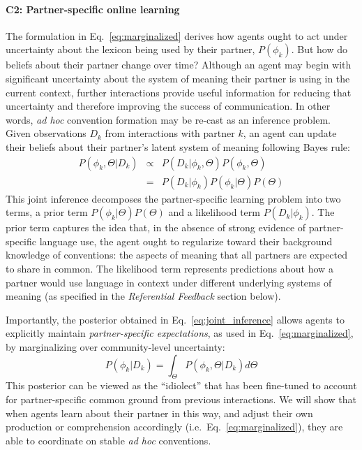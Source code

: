 \paragraph{C2: Partner-specific online learning}

The formulation in Eq.~\ref{eq:marginalized} derives how agents ought to act under uncertainty about the lexicon being used by their partner, $P(\phi_k)$.
But how do beliefs about their partner change over time?
Although an agent may begin with significant uncertainty about the system of meaning their partner is using in the current context, further interactions provide useful information for reducing that uncertainty and therefore improving the success of communication.
In other words, \emph{ad hoc} convention formation may be re-cast as an inference problem.
Given observations $D_k$ from interactions with partner $k$, an agent can update their beliefs about their partner's latent system of meaning following Bayes rule:
\begin{equation}
\begin{array}{rcl}
\label{eq:joint_inference}
P(\phi_k, \Theta | D_k)  & \propto &  P(D_k | \phi_k, \Theta) P(\phi_k, \Theta) \\
                           & =   & P(D_k | \phi_k) P(\phi_k | \Theta) P(\Theta)
\end{array}
\end{equation}
This joint inference decomposes the partner-specific learning problem into two terms, a prior term $P(\phi_k | \Theta)P(\Theta)$ and a likelihood term $P(D_k | \phi_k)$.
The prior term captures the idea that, in the absence of strong evidence of partner-specific language use, the agent ought to regularize toward their background knowledge of conventions: the aspects of meaning that all partners are expected to share in common.
The likelihood term represents predictions about how a partner would use language in context under different underlying systems of meaning (as specified in the \emph{Referential Feedback} section below).

Importantly, the posterior obtained in Eq.~\ref{eq:joint_inference} allows agents to explicitly maintain \emph{partner-specific expectations}, as used in Eq.~\ref{eq:marginalized}, by marginalizing over community-level uncertainty:
\begin{equation}
P(\phi_k | D_k) =  \int_{\Theta}P(\phi_k, \Theta | D_k)  d\Theta
\end{equation}
This posterior can be viewed as the ``idiolect'' that has been fine-tuned to account for partner-specific common ground from previous interactions.
We will show that when agents learn about their partner in this way, and adjust their own production or comprehension accordingly (i.e.~Eq.~\ref{eq:marginalized}), they are able to coordinate on stable \emph{ad hoc} conventions.

